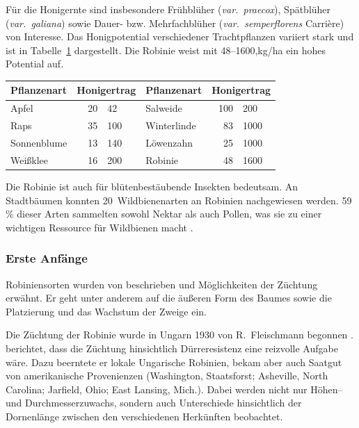 \documentclass[twocolumn]{scrartcl}
\begin{document}
Für die Honigernte sind insbesondere Frühblüher
(\emph{var.\ praecox}), Spätblüher (\emph{var.\ galiana}) sowie Dauer-
bzw. Mehrfachblüher (\emph{var.\ semperflorens} Carrière) von
Interesse.  Das Honigpotential verschiedener Trachtpflanzen variiert
stark und ist in Tabelle~\ref{tab:honigertraege} dargestellt. Die
Robinie weist mit 48--1600,kg/ha ein hohes Potential auf.

\begin{table}[htbp]
\centering
\begin{tabular}{
    l r@{\,--\,}l 
    l r@{\,--\,}l
}
\toprule
\textbf{Pflanzenart} & \multicolumn{2}{c}{\textbf{Honigertrag}} &
\textbf{Pflanzenart} & \multicolumn{2}{c}{\textbf{Honigertrag}} \\
\midrule
Apfel         &  20 &  \hphantom{1}42    & Salweide     & 100 & \hphantom{1}200 \\
Raps          &  35 &  100    & Winterlinde  &  83 & 1000 \\
Sonnenblume   &  13 &  140    & Löwenzahn    &  25 & 1000 \\
Weißklee      &  16 &  200    & Robinie      &  48 & 1600 \\
\bottomrule
\end{tabular}
\label{tab:honigertraege}
\end{table}

Die Robinie ist auch für blütenbestäubende Insekten bedeutsam.  An
Stadtbäumen konnten 20~Wildbienenarten an Robinien nachgewiesen
werden.  59\,\% dieser Arten sammelten sowohl Nektar als auch Pollen,
was sie zu einer wichtigen Ressource für Wildbienen macht
\citep{hausmann2016bienen}.

\subsubsection{Erste Anfänge}

Robiniensorten wurden von \citet{vilmos1908robiniensorten} beschrieben
und Möglichkeiten der Züchtung erwähnt. Er geht unter anderem auf die
äußeren Form des Baumes sowie die Platzierung und das Wachstum der
Zweige ein.

Die Züchtung der Robinie wurde in Ungarn 1930 von R.~Fleischmann
begonnen \citep{keresztesi1983robinie}. \citet{fleischmann1933robinie}
berichtet, dass die Züchtung hinsichtlich Dürreresistenz eine
reizvolle Aufgabe wäre. Dazu beerntete er lokale Ungarische Robinien,
bekam aber auch Saatgut von amerikanische Provenienzen (Washington,
Staatsforst; Asheville, North Carolina; Jarfield, Ohio; East Lansing,
Mich.). %
Dabei werden nicht nur Höhen-- und Durchmesserzuwachs, sondern auch
Unterschiede hinsichtlich der Dornenlänge zwischen den verschiedenen
Herkünften beobachtet.
\end{document}
